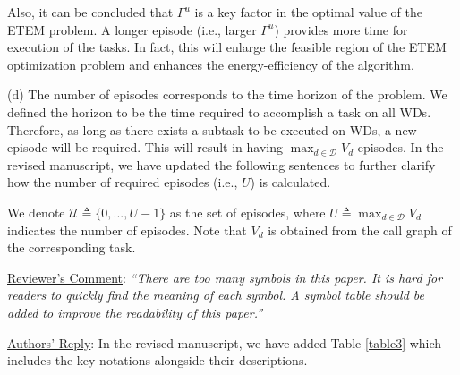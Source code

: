 \documentclass[12pt,draftclsnofoot,onecolumn]{IEEEtran}
\newcommand{\rev}[1]{{\color{blue}#1}} %
\newcommand{\rev}[1]{#1}
\newenvironment{my}[2]%
{\begin{list}{}%
{\setlength{\rightmargin}{#1}\setlength{\leftmargin}{#2}}%


 \item[]{}

} {\end{list}}
\begin{document}
\begin{enumerate}
\begin{my}{1cm}{1cm}
	\rev{Also, it can be concluded that $\Gamma^u$ is a key factor in the optimal value of the ETEM problem. A longer episode (i.e., larger $\Gamma^u$) provides more time for execution of the tasks. In fact, this will enlarge the feasible region of the ETEM optimization problem and enhances the energy-efficiency of the algorithm.}\newline
\end{my}

(d) The number of episodes corresponds to the time horizon of the problem. We defined the horizon to be the time required to accomplish a task on all WDs. Therefore, as long as there exists a subtask to be executed on WDs, a new episode will be required. This will result in having $\max_{d\in\mathcal{D}}V_d$ episodes. In the revised manuscript, we have updated the following sentences to further clarify how the number of required episodes (i.e., $U$) is calculated.\\

\begin{my}{1cm}{1cm}
	\rev{We denote $\mathcal{U}\triangleq\{0,...,U-1\}$ as the set of episodes, where $U\triangleq\max_{d\in\mathcal{D}}V_d$  indicates the number of episodes. Note that $V_d$ is obtained from the call graph of the corresponding task. \newline}
\end{my}

\item \underline{Reviewer's Comment}: \textit {``There are too many symbols in this paper. It is hard for readers to quickly find the meaning of each symbol. A symbol table should be added to improve the readability of this paper.''} \newline

\underline{Authors' Reply}: In the revised manuscript, we have added Table \ref{table3} which includes the key notations alongside their descriptions. \newline

\setcounter{table}{0}


\end{enumerate}
\end{document}
